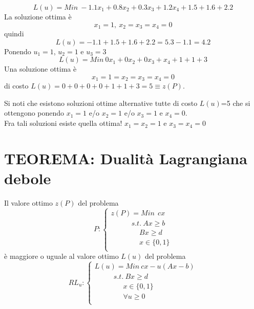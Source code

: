 \begin{equation*}
	L(u)=Min\  -1.1x_{1}+0.8x_{2}+0.3x_{3}+1.2x_{4}+1.5+1.6+2.2
\end{equation*}
La soluzione ottima è
\begin{equation*}
	x_{1}=1,\ x_{2}=x_{3}=x_{4}=0
\end{equation*}
quindi
\begin{equation*}
	L(u)=-1.1+1.5+1.6+2.2=5.3-1.1=4.2
\end{equation*}
Ponendo $u_{1}=1$, $u_{2}=1$ e $u_{3}=3$
\begin{equation*}
L(u)=Min\  0x_{1}+0x_{2}+0x_{3}+x_{4}+1+1+3
\end{equation*}
Una soluzione ottima è
\begin{equation*}
x_{1}=1=x_{2}=x_{3}=x_{4}=0
\end{equation*}
di costo $L(u)=0+0+0+0+1+1+3=5\equiv z(P)$.

Si noti che esistono soluzioni ottime alternative tutte di costo $L(u)$=5 che si ottengono ponendo $x_{1}=1$ e/o $x_{2}=1$ e/o $x_{3}=1$ e $x_{4}=0$.\\
Fra tali soluzioni esiste quella ottima! $x_{1}=x_{2}=1$ e $x_{3}=x_{4}=0$

\section{TEOREMA: Dualità Lagrangiana debole}
Il valore ottimo $z(P)$ del problema
\begin{displaymath}
P:
\begin{cases}
z(P)=Min\ \ cx \\
\ \ \ \ \ \ \ \ \ \ \ \ \ s.t.\ Ax\ge b \\
\ \ \ \ \ \ \ \ \ \ \ \ \ \ \ \ \ \ Bx\ge d \\
\ \ \ \ \ \ \ \ \ \ \ \ \ \ \ \ \ \ x\in \{0,1\} \\
\end{cases}
\end{displaymath}
è maggiore o uguale al valore ottimo $L(u)$ del problema
\begin{displaymath}
RL_{u}:
\begin{cases}
L(u)=Min\ cx-u(Ax-b) \\
\ \ \ \ \ \ \ \ \ \ \ \ s.t.\ Bx\ge d \\
\ \ \ \ \ \ \ \ \ \ \ \ \ \ \ \ \ \ x\in \{0,1\} \\
\ \ \ \ \ \ \ \ \ \ \ \ \ \ \ \ \ \ \forall u\ge 0 \\
\end{cases}
\end{displaymath}
